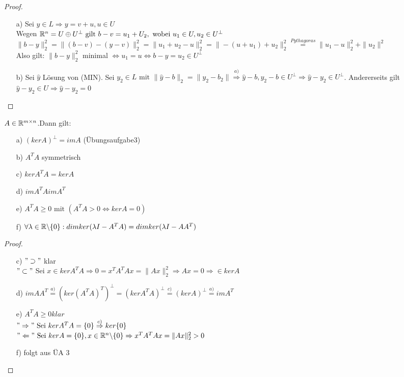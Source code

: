 \begin{proof}\hfill
\begin{itemize}
\item[a)] Sei $y \in L \Rightarrow y=v+u, u\in U$\\Wegen $\mathbb R^n=U \oplus U^{\perp} \text{ gilt } b-v=u_1+U_2, \text{ wobei } u_1\in U, u_2 \in U^{\perp}$\\
$\|b-y\|_2^{2} =\|(b-v)-(y-v)\|_2^{2}=\|u_1+u_2-u\|_2^{2}=\|-(u+u_1)+u_2\|_2^{2} \overset{Pythagoras}{=}\|u_1-u\|_2^{2} + \|u_2\|^{2}$\\
Also gilt: $\|b-y\|_2^{2}$ minimal $\Leftrightarrow u_1=u \Leftrightarrow b-y = u_2 \in U^{\perp}$\\
\item[b)] Sei $\hat{y}$ Lösung von (MIN). Sei $y_2 \in L \text{ mit }\|\hat{y}-b\|_2 =\|y_2-b_2\| \overset{a)}{\Rightarrow} \hat{y}-b,y_2-b \in U^{\perp} \Rightarrow \hat{y}-y_2 \in U^{\perp}$.
Andererseits gilt $\hat{y}-y_2 \in U \Rightarrow \hat{y}-y_2=0$
\end{itemize}
\end{proof}
\begin{Satz}
$A \in \mathbb R^{m \times n}$.Dann gilt:\\\begin{itemize}
\item[a)]$(ker A)^{\perp} = im A$ (Übungsaufgabe3)
\item[b)]$A^TA$ symmetrisch
\item[c)]$ker A^TA = ker A$
\item[d)]$im A^TA im A^T$
\item[e)]$A^TA \ge 0 \text{ mit } (A^TA>0 \Leftrightarrow ker A = {0})$
\item[f)] $\forall \lambda \in \mathbb R\backslash\{0\}: dim ker(\lambda I-A^TA) = dim ker(\lambda I-AA^T)$
\end{itemize}
\end{Satz}
\begin{proof}\hfill
\begin{itemize}
\item[c)]$"\supset"$ klar\\
$" \subset" $ Sei $x \in ker A^TA \Rightarrow 0=x^TA^TAx=\|Ax\|_2^{2} \Rightarrow Ax=0 \Rightarrow \in ker A$
\item[d)]$im AA^T \overset{a)}{=} (ker(A^TA)^T)^{\perp} = (ker A^TA)^{\perp} \overset{c)}{=} (ker A)^{\perp} \overset{a)}{=} im A^T$
\item[e)]$A^TA\ge 0 klar$\\$" \Rightarrow"\text{ Sei } ker A^TA =\{0\} \overset{c)}{\Rightarrow}ker\{0\}$\\$"\Leftarrow" \text{ Sei } ker A=\{0\}, x\in \mathbb R^n\backslash\{0\} \Rightarrow x^TA^TAx = \|Ax\|_2^{2} > 0$
\item[f)] folgt aus ÜA 3
\end{itemize}
\end{proof}
